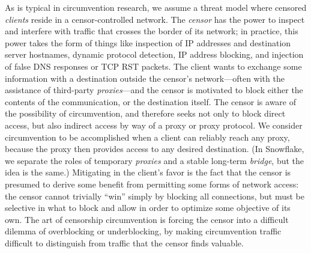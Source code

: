 \documentclass[letterpaper,twocolumn]{article}
\newcommand{\firstterm}[1]{\textit{#1}}
\begin{document}
As is typical in circumvention research,
we assume a threat model where
censored \firstterm{clients} reside in a censor-controlled network.
The \firstterm{censor} has the power to inspect and interfere with
traffic that crosses the border of its network;
in practice, this power takes the form of things like
inspection of IP addresses and destination server hostnames,
dynamic protocol detection,
IP address blocking, and injection of false DNS responses
or TCP RST packets.
The client wants to exchange some information with a
destination outside the censor's network---often
with the assistance of third-party \firstterm{proxies}---and
the censor is motivated to block either the contents
of the communication, or the destination itself.
The censor is aware of the possibility of circumvention,
and therefore seeks not only to block direct access,
but also indirect access by way of a proxy or proxy protocol.
We consider circumvention to be accomplished when a client
can reliably reach any proxy,
because the proxy then provides access to any desired destination.
(In Snowflake, we separate the roles of temporary \firstterm{proxies}
and a stable long-term \firstterm{bridge}, but the idea is the same.)
Mitigating in the client's favor
is the fact that the censor is presumed to derive some benefit
from permitting some forms of network access:
the censor cannot trivially ``win''
simply by blocking all connections,
but must be selective in what to block and allow
in order to optimize some objective of its own.
The art of censorship circumvention is
forcing the censor into a difficult dilemma
of overblocking or underblocking,
by making circumvention traffic difficult to distinguish
from traffic that the censor finds valuable.
\end{document}
